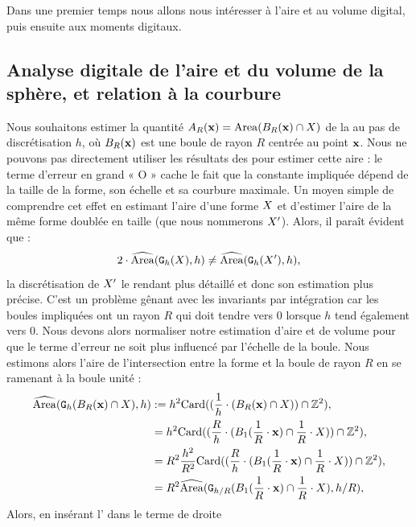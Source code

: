 Dans une premier temps nous allons nous intéresser à l'aire et au volume
digital, puis ensuite aux moments digitaux.
%
\subsection{Analyse digitale de l'aire et du volume de la sphère, et relation à la courbure}
%
Nous souhaitons estimer la quantité $A_R(\vx) = \Area(\Ball{R}{\vx}\cap\Shape)$ de la
 au pas de discrétisation $h$, où $\Ball{R}{\vx}$ est une
boule de rayon $R$ centrée au point $\vx$. Nous ne pouvons pas directement
utiliser les résultats des
 pour estimer cette
aire : le terme d'erreur en grand « O » cache le fait que la constante impliquée
dépend de la taille de la forme, son échelle et sa courbure maximale. Un moyen
simple de comprendre cet effet en estimant l'aire d'une forme $\Shape$ et
d'estimer l'aire de la même forme doublée en taille (que nous nommerons
$\Shape'$). Alors, il paraît évident que :
%
\begin{equation}
  2 \cdot \AreaC(\DSh,h) \ne \AreaC(\DigF{\Shape'}{h},h),
\end{equation}
%
la discrétisation de $\Shape'$ le rendant plus détaillé et donc son estimation
plus précise. C'est un problème gênant avec les invariants par intégration car
les boules impliquées ont un rayon $R$ qui doit tendre vers $0$ lorsque $h$ tend
également vers $0$. Nous devons alors normaliser notre estimation d'aire et de
volume pour que le terme d'erreur ne soit plus influencé par l'échelle de la
boule. Nous estimons alors l'aire de l'intersection entre la forme et la boule
de rayon $R$ en se ramenant à la boule unité :
%
\begin{align}
  \AreaC(\DigF{\Ball{R}{\vx} \cap \Shape}{h}, h) & \EqDef h^2 \MCard( ( \frac{1}{h} \cdot ( \Ball{R}{\vx} \cap \Shape ) ) \cap \Z^2 ), \\
   & = h^2 \MCard( (\frac{R}{h} \cdot ( \Ball{1}{\frac{1}{R} \cdot \vx} \cap \frac{1}{R} \cdot \Shape) ) \cap \Z^2 ), \\
   & = R^2 \frac{h^2}{R^2} \MCard( (\frac{R}{h} \cdot ( \Ball{1}{\frac{1}{R} \cdot \vx} \cap \frac{1}{R} \cdot \Shape) ) \cap \Z^2 ), \\
   & = R^2 \AreaC( \DigF{\Ball{1}{\frac{1}{R} \cdot \vx} \cap \frac{1}{R} \cdot \Shape}{h/R}, h/R ), \label{eq:Area_unitary_ball}
\end{align}
%
Alors, en insérant l' dans le terme de droite
